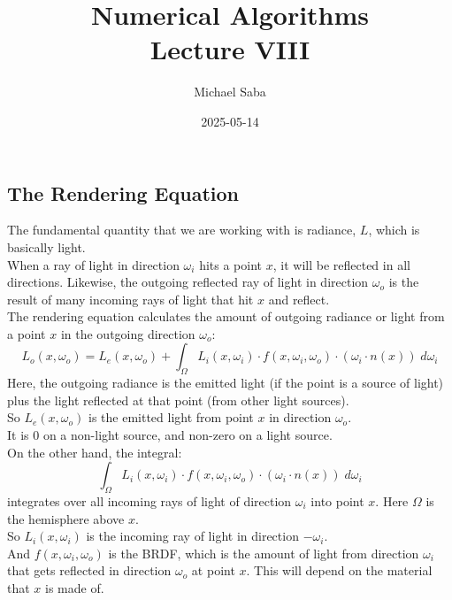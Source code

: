 \documentclass[12pt]{article}
\title{%
    \Huge Numerical Algorithms \\
    \Large Lecture VIII
}
\date{2025-05-14}
\author{Michael Saba}
\begin{document}
\maketitle
\newpage
\setlength{\parindent}{0pt}

\subsection*{The Rendering Equation}

The fundamental quantity that we are working
with is radiance, $L$, which is basically light. \\

When a ray of light in direction $\omega_i$
hits a point $x$, it will be reflected in all directions.
Likewise, the outgoing reflected ray of light in
direction $\omega_o$ is the result of many incoming
rays of light that hit $x$ and reflect. \\

The rendering equation calculates the amount of
outgoing radiance or light from a point $x$
in the outgoing direction $\omega_o$:
\[ L_{o}(x, \omega_o)
= L_{e}(x, \omega_o)
+ \int_\Omega L_{i}(x, \omega_i) \cdot
f(x, \omega_i, \omega_o) \cdot
(\omega_i \cdot n(x)) \; d\omega_i \]
Here, the outgoing radiance is the emitted light
(if the point is a source of light)
plus the light reflected at that point (from other
light sources). \\

So $L_{e}(x, \omega_o)$ is the emitted light 
from point $x$ in direction $\omega_o$. \\
It is $0$ on a non-light source, and non-zero
on a light source. \\
 
On the other hand, the integral:
\[ \int_\Omega L_{i}(x, \omega_i) \cdot
f(x, \omega_i, \omega_o) \cdot
(\omega_i \cdot n(x)) \; d\omega_i \]
integrates over all incoming rays of light
of direction $\omega_i$ into point $x$.
Here $\Omega$ is the hemisphere above $x$. \\

So $L_{i}(x, \omega_i)$ is the incoming ray
of light in direction $-\omega_i$. \\

And $f(x, \omega_i, \omega_o)$ is the BRDF, 
which is the amount of light from direction $\omega_i$
that gets reflected in direction $\omega_o$
at point $x$.
This will depend on the material that $x$ is made of. \\
\end{document}
